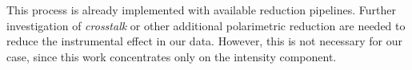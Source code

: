 This process is already implemented with available reduction pipelines. Further investigation of \emph{crosstalk} or other additional polarimetric reduction are needed to reduce the instrumental effect in our data. However, this is not necessary for our case, since this work concentrates only on the intensity component.
\begin{comment}
When one of the components of the Stokes vector is mixed into the others (for example I into Q, U or V) we have a contamination of those components, or \emph{crosstalk}. After the polarimetric reduction process there can still be some residual \emph{crosstalk} which can be removed using statistical methods \citep{Collados:2003lr} . Unfortunately this method is not appropriate for our limb observations, since it is based on assumptions which are valid only near disc center. In our case we remove the residual \emph{crosstalk} using the following methods (all other residual \emph{crosstalks}, like V $\rightarrow$ Q, are an order of magnitude lower and are not treated):
\begin{itemize}
\item $I_{disc}$ $\rightarrow$ \{Q,U,V\} : Although we are observing off the limb, at small distances to the disc there is an important contribution of the disc spectra to the data, due to the scattering by the atmosphere and due to image motion and blurring.
This spectral intensity profile of unpolarized light from the disc can also contaminate the other Stokes profiles. The observed spectral region contains, apart from spectral lines, also continua. Since the polarization in these continuum regions should be zero, all non-zero polarization must come from the contamination of I, so we know the strength of the disc signal that should be subtracted.

\item $I_{off-the-limb}$ $\rightarrow$ \{Q,U,V\} : The intensity signal of the emission profiles can also produce false signals in other Stokes components. To remove them (wherever detected), we use the fact that the blue component of the  \ion{He}{i} 10830 \AA\ multiplet is not polarized and therefore should not show any Q, U or V. 

Since we know that Q and U both should be symmetric and  V antisymmetric, we can therefore estimate the crosstalk from I.

\end{itemize}

Finally rotate the axis which defines the orientation of linear polarization (see Sec. \ref{intro:polarimetry}). We want to have $Q > 0$ parallel to the limb. Given the definition of the Stokes parameters this transformation is simply:
\begin{eqnarray}
Q_{limb} = \cos(2\alpha) \cdot Q_{N} + \sin(2\alpha) \cdot U_{N} 
\cr
U_{limb} = -\sin(2\alpha) \cdot Q_{N} + \cos(2\alpha) \cdot U_{N}
\end{eqnarray}
where $\alpha$ is the angle between the observed limb and terrestrial north-south direction (subscript N). This latter direction is the conventional one according the instrument calibration process.
\end{comment}
